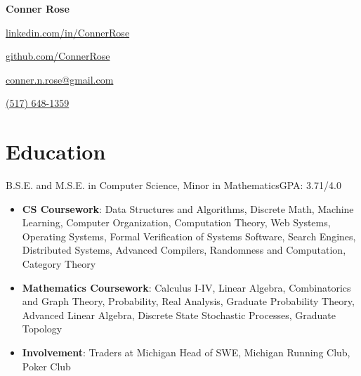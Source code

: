 \documentclass[letterpaper,11pt]{article}
\begin{document}
\begin{center}
  \huge{\textbf{Conner Rose}} \\
  \begin{itemize*}
    \item[] \href{https://linkedin.com/in/ConnerRose}{linkedin.com/in/ConnerRose}
    \item \href{https://github.com/ConnerRose}{github.com/ConnerRose}
    \item \href{mailto:conner.n.rose@gmail.com}{conner.n.rose@gmail.com}
    \item \href{tel:+15176481359}{(517) 648-1359}
  \end{itemize*}
\end{center}

\section{Education}
{B.S.E. and M.S.E. in Computer Science, Minor in Mathematics}{GPA: 3.71/4.0}
\begin{itemize}
  \item \textbf{CS Coursework}: Data Structures and Algorithms, Discrete Math,
        Machine Learning, Computer Organization, Computation Theory,
        Web Systems, Operating Systems, Formal Verification of Systems
        Software,
        Search Engines, Distributed Systems, Advanced Compilers,
        Randomness and Computation, Category Theory
  \item \textbf{Mathematics Coursework}: Calculus I-IV, Linear Algebra,
        Combinatorics and Graph Theory, Probability, Real Analysis, Graduate
        Probability Theory, Advanced Linear Algebra, Discrete State Stochastic
        Processes, Graduate Topology
  \item \textbf{Involvement}: Traders at Michigan Head of SWE, Michigan Running Club, Poker Club
\end{itemize}
\end{document}
